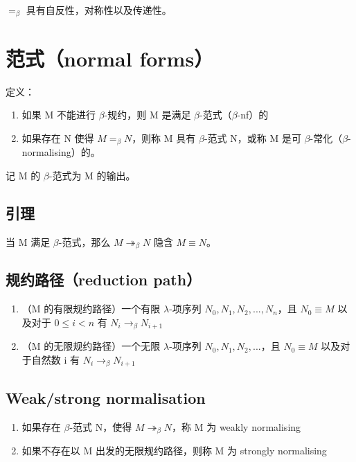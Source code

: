 \documentclass[UTF8]{article}
\begin{document}
	$=_\beta$ 具有自反性，对称性以及传递性。

\section{范式（normal forms）}

	定义：
	\begin{enumerate}
		\item 如果 M 不能进行 $\beta$-规约，则 M 是满足 $\beta$-范式（$\beta$-nf）的
		\item 如果存在 N 使得 $M =_\beta N$，则称 M 具有 $\beta$-范式 N，或称 M 是可 $\beta$-常化（$\beta$-normalising）的。
	\end{enumerate}

	记 M 的 $\beta$-范式为 M 的输出。

\subsection{引理}

	当 M 满足 $\beta$-范式，那么 $M \twoheadrightarrow_\beta N$ 隐含 $M \equiv N$。

\subsection{规约路径（reduction path）}

	\begin{enumerate}
		\item （M 的有限规约路径）一个有限 $\lambda$-项序列 $N_0, N_1, N_2, ..., N_n$，且 $N_0 \equiv M$ 以及对于 $0 \le i < n$ 有 $N_i \rightarrow_\beta N_{i+1}$
		\item （M 的无限规约路径）一个无限 $\lambda$-项序列 $N_0, N_1, N_2, ...$，且 $N_0 \equiv M$ 以及对于自然数 i 有 $N_i \rightarrow_\beta N_{i+1}$
	\end{enumerate}

\subsection{Weak/strong normalisation}

	\begin{enumerate}
		\item 如果存在 $\beta$-范式 N，使得 $M \twoheadrightarrow_\beta N$，称 M 为 weakly normalising
		\item 如果不存在以 M 出发的无限规约路径，则称 M 为 strongly normalising
	\end{enumerate}
\end{document}
